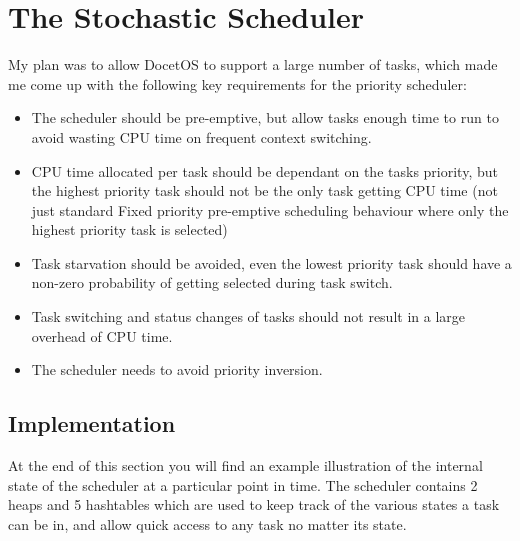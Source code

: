 \documentclass[12pt,a4paper]{article}
\begin{document}
\section{The Stochastic Scheduler}
My plan was to allow DocetOS to support a large number of tasks, which made me come up with the following key requirements for the priority scheduler:
\begin{itemize}
  \item The scheduler should be pre-emptive, but allow tasks enough time to run to avoid wasting CPU time on frequent context switching.
  \item CPU time allocated per task should be dependant on the tasks priority, but the highest priority task should not be the only task getting CPU time (not just standard Fixed priority pre-emptive scheduling behaviour where only the highest priority task is selected)
  \item Task starvation should be avoided, even the lowest priority task should have a non-zero probability of getting selected during task switch.
  \item Task switching and status changes of tasks should not result in a large overhead of CPU time.
    \item The scheduler needs to avoid priority inversion.
\end{itemize}

\pagebreak
\subsection{Implementation}
At the end of this section you will find an example illustration of the internal state of the scheduler at a particular point in time. The scheduler contains 2 heaps and 5 hashtables which are used to keep track of the various states a task can be in, and allow quick access to any task no matter its state.
\end{document}
